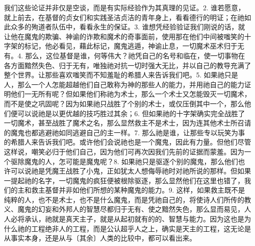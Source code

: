 我们这些论证并非仅是空谈，而是有实际经验作为其真理的见证。\newline{}2. 谁若愿意，就上前去，在基督的贞女们和实践圣洁贞洁的青年身上，看看德行的明证；在祂如此众多的殉道者队伍中，看看永生的保证。\newline{}3. 谁想凭经验验证我们刚说的话，就让他在魔鬼的欺骗、神谕的诈欺和魔术的奇事面前，使用那在他们中间被嗤笑的十字架的标记，他必看见，藉此标记，魔鬼逃遁，神谕止息，一切魔术巫术归于无有。\newline{}4. 那么，这位基督是谁，何等伟大？祂凭自己的名号和临在，使一切事物在各方面黯然失色、归于无有，唯独祂对抗一切时强大无比，并以自己的教导充满了整个世界。让那些喜欢嗤笑而不知羞耻的希腊人来告诉我们吧。\newline{}5. 如果祂只是人，那么一个人怎能超越他们自己敢称为神的那些人的能力，并用祂自己的能力证明他们一无所有呢？但如果他们称祂为术士，那么一个术士又怎能毁灭一切魔术，而不是使之巩固呢？因为如果祂只战胜了个别的术士，或仅压倒其中一个，那么他们便可以说祂是以更优越的技巧胜过其余；\newline{}6. 但如果祂的十字架确实完全战胜了一切魔术，甚至战胜了魔术之名，那么显然救主不是术士，因为连其他术士所召请的魔鬼也都逃避祂如同逃避自己的主一样。\newline{}7. 那么祂是谁，让那些专以玩笑为事的希腊人来告诉我们吧。或许他们会说祂也是一个魔鬼，因此有力量。但他们尽管这样说，嘲笑必归于他们自己，因为他们可再次因我们先前的证据而蒙羞。因为一个驱除魔鬼的人，怎可能是魔鬼呢？\newline{}8. 如果祂只是驱逐个别的魔鬼，那么他们也许可以说祂是凭魔王战胜了小鬼，正如犹太人想侮辱祂时对祂所说的那样。但如果一提起祂的名字，一切魔鬼的疯狂便被根除驱逐，那么显然他们在这里也错了，我们的主和救主基督并非如他们所想的某种魔鬼的能力。\newline{}9. 这样，如果救主既不是纯粹的人，也不是术士，也不是什么魔鬼，而是凭祂自己的，将使诗人们所传的教义、魔鬼的幻妄和外邦人的智慧尽都归于无有、使之黯然失色，那么显而易见，人人必将承认，祂就是真天主子，就是从起初就有的的、智慧与能力。因为这也是为什么祂的工程绝非人的工程，而是公认超乎人之上，确实是天主的工程，这无论是从事实本身，还是从与〔其余〕人类的比较中，都可以看出来。\par


\section{}

